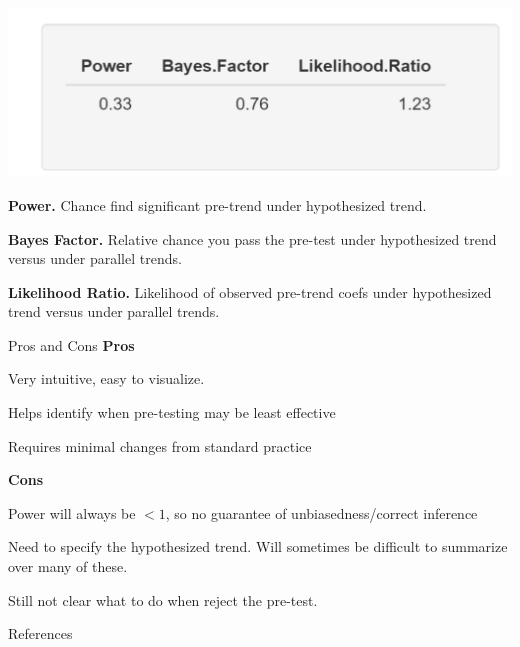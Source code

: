 \documentclass[aspectratio = 169, 13pt]{beamer}
\begin{document}
\begin{frame}
	\centering
	\includegraphics[width = 0.7 \textwidth]{figures/Shiny-Mockup-Power-Only.png} 
	\begin{wideitemize}
		\item
		\textbf{Power.} Chance find significant pre-trend under hypothesized trend.
		\item
		\textbf{Bayes Factor.} Relative chance you pass the pre-test under hypothesized trend versus under parallel trends.
		\item
		\textbf{Likelihood Ratio.} Likelihood of observed pre-trend coefs under hypothesized trend versus under parallel trends.
	\end{wideitemize}
\end{frame}

\begin{frame}{Pros and Cons}
	\textbf{Pros}
	\begin{wideitemize}
		\item
		Very intuitive, easy to visualize.
		
		\item
		Helps identify when pre-testing may be least effective
		    
		\item
		Requires minimal changes from standard practice
	\end{wideitemize}
	
	\textbf{Cons}
	
	\begin{wideitemize}
		\item
		Power will always be $<1$, so no guarantee of unbiasedness/correct inference
		    
		\item
		Need to specify the hypothesized trend. Will sometimes be difficult to summarize over many of these.
		    
		\item
		Still not clear what to do when reject the pre-test.
	\end{wideitemize}
	    
\end{frame}

\begin{frame}{References}
	
\end{frame}
\end{document}
